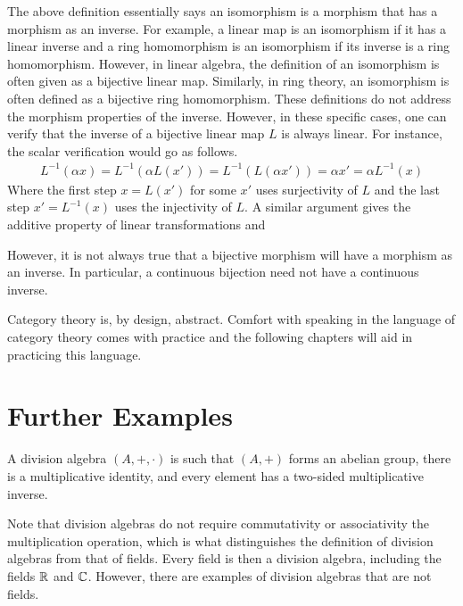 \documentclass[../sean_thesis.tex]{subfiles}
\begin{document}
The above definition essentially says an isomorphism is a morphism that has a morphism as an inverse. For example, a linear map is an isomorphism if it has a linear inverse and a ring homomorphism is an isomorphism if its inverse is a ring homomorphism. However, in linear algebra, the definition of an isomorphism is often given as a bijective linear map. Similarly, in ring theory, an isomorphism is often defined as a bijective ring homomorphism. These definitions do not address the morphism properties of the inverse. However, in these specific cases, one can verify that the inverse of a bijective linear map $L$ is always linear. For instance, the scalar verification would go as follows.
\begin{align*}
	L^{-1}(\alpha x) 
	= L^{-1}(\alpha L(x')) 
	= L^{-1}(L(\alpha x'))
	= \alpha x'
	= \alpha L^{-1}(x)
\end{align*}
Where the first step $x = L(x')$ for some $x'$ uses surjectivity of $L$ and the last step $x' = L^{-1}(x)$ uses the injectivity of $L$. A similar argument gives the additive property of linear transformations and 

However, it is not always true that a bijective morphism will have a morphism as an inverse. In particular, a continuous bijection need not have a continuous inverse.

Category theory is, by design, abstract. Comfort with speaking in the language of category theory comes with practice and the following chapters will aid in practicing this language.

\section{Further Examples}

\begin{definition}
	A division algebra $(A,+,\cdot)$ is such that $(A,+)$ forms an abelian group, there is a multiplicative identity, and every element has a two-sided multiplicative inverse.
\end{definition}%
Note that division algebras do not require commutativity or associativity the multiplication operation, which is what distinguishes the definition of division algebras from that of fields. Every field is then a division algebra, including the fields $\mathbb{R}$ and $\mathbb{C}$. However, there are examples of division algebras that are not fields.
 
\end{document}
